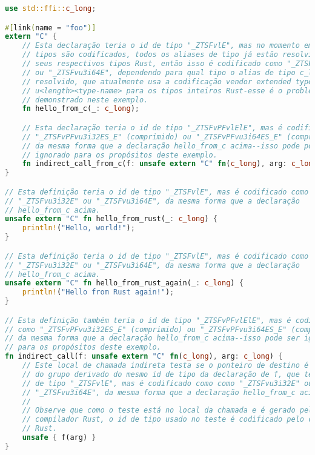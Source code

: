 \documentclass{article}
\begin{document}
\begin{lstlisting}[language=Rust, caption={Exemplo de programa Rust usando tipos inteiros Rust e a codificação do compilador Rust.}]
use std::ffi::c_long;

#[link(name = "foo")]
extern "C" {
    // Esta declaração teria o id de tipo "_ZTSFvlE", mas no momento em que os
    // tipos são codificados, todos os aliases de tipo já estão resolvidos para
    // seus respectivos tipos Rust, então isso é codificado como "_ZTSFvu3i32E"
    // ou "_ZTSFvu3i64E", dependendo para qual tipo o alias de tipo c_long é
    // resolvido, que atualmente usa a codificação vendor extended type
    // u<length><type-name> para os tipos inteiros Rust-esse é o problema
    // demonstrado neste exemplo.
    fn hello_from_c(_: c_long);

    // Esta declaração teria o id de tipo "_ZTSFvPFvlElE", mas é codificado como
    // "_ZTSFvPFvu3i32ES_E" (comprimido) ou "_ZTSFvPFvu3i64ES_E" (comprimido),
    // da mesma forma que a declaração hello_from_c acima--isso pode pode ser
    // ignorado para os propósitos deste exemplo.
    fn indirect_call_from_c(f: unsafe extern "C" fn(c_long), arg: c_long);
}

// Esta definição teria o id de tipo "_ZTSFvlE", mas é codificado como
// "_ZTSFvu3i32E" ou "_ZTSFvu3i64E", da mesma forma que a declaração
// hello_from_c acima.
unsafe extern "C" fn hello_from_rust(_: c_long) {
    println!("Hello, world!");
}

// Esta definição teria o id de tipo "_ZTSFvlE", mas é codificado como
// "_ZTSFvu3i32E" ou "_ZTSFvu3i64E", da mesma forma que a declaração
// hello_from_c acima.
unsafe extern "C" fn hello_from_rust_again(_: c_long) {
    println!("Hello from Rust again!");
}

// Esta definição também teria o id de tipo "_ZTSFvPFvlElE", mas é codificado
// como "_ZTSFvPFvu3i32ES_E" (comprimido) ou "_ZTSFvPFvu3i64ES_E" (comprimido),
// da mesma forma que a declaração hello_from_c acima--isso pode ser ignorado
// para os propósitos deste exemplo.
fn indirect_call(f: unsafe extern "C" fn(c_long), arg: c_long) {
    // Este local de chamada indireta testa se o ponteiro de destino é um membro
    // do grupo derivado do mesmo id de tipo da declaração de f, que teria o id
    // de tipo "_ZTSFvlE", mas é codificado como como "_ZTSFvu3i32E" ou
    // "_ZTSFvu3i64E", da mesma forma que a declaração hello_from_c acima.
    //
    // Observe que como o teste está no local da chamada e é gerado pelo
    // compilador Rust, o id de tipo usado no teste é codificado pelo compilador
    // Rust.
    unsafe { f(arg) }
}


\end{lstlisting}
\end{document}
